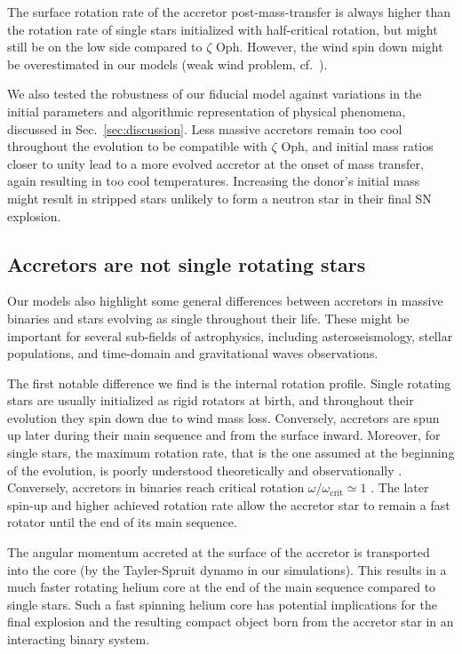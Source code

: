 \documentclass[twocolumn,twocolappendix,trackchanges]{aastex63}
\DeclareRobustCommand{\Secref}[1]{Sec.~\ref{#1}}
\newcommand{\zoph}{$\zeta$ Oph}
\begin{document}
The surface rotation rate of the accretor post-mass-transfer is always
higher than the rotation rate of single stars initialized with
half-critical rotation, but might still be on the low side compared to
\zoph. However, the wind spin down might be overestimated in our
models (weak wind problem, cf.\ \citealt{marcolino:09, lucy:12, lagae:21}).

We also tested the
robustness of our fiducial model against variations in the initial parameters
and algorithmic representation of physical phenomena, discussed in
\Secref{sec:discussion}. Less massive accretors remain too cool
throughout the evolution to be compatible with \zoph, and initial mass
ratios closer to unity lead to a more evolved accretor at the onset of
mass transfer, again resulting in too cool temperatures. Increasing
the donor's initial mass might result in stripped stars unlikely to
form a neutron star in their final SN explosion.

\subsection{Accretors are not single rotating stars}

Our models also highlight some general differences between accretors in massive
binaries and stars evolving as single throughout their life. These
might be important for several
sub-fields of astrophysics, including asteroseismology, stellar
populations, and time-domain and gravitational waves observations.

The first notable difference we find is the internal rotation
profile. Single rotating stars are usually initialized as rigid
rotators at birth, and throughout their evolution they spin down due
to wind mass loss. Conversely, accretors are spun up later during
their main sequence and from the surface inward. Moreover,
for single stars, the maximum rotation rate, that is the one assumed
at the beginning of the evolution, is poorly understood theoretically
and observationally \citep[e.g.,][]{ramirez-agudelo:13,
  ramirez-agudelo:15}. Conversely, accretors in binaries reach
critical rotation $\omega/\omega_\mathrm{crit}\simeq 1$
\citep[e.g.,][]{packet:81}. The later spin-up and higher achieved
rotation rate allow the accretor star to remain a fast rotator until
the end of its main sequence.

The angular momentum accreted at the surface of the accretor is
transported into the core (by the Tayler-Spruit dynamo in our
simulations). This results in a much faster rotating helium core at
the end of the main sequence compared to single stars. Such a fast
spinning helium core has potential implications for the final
explosion and the resulting compact object born from the accretor star
in an interacting binary system.
\end{document}
